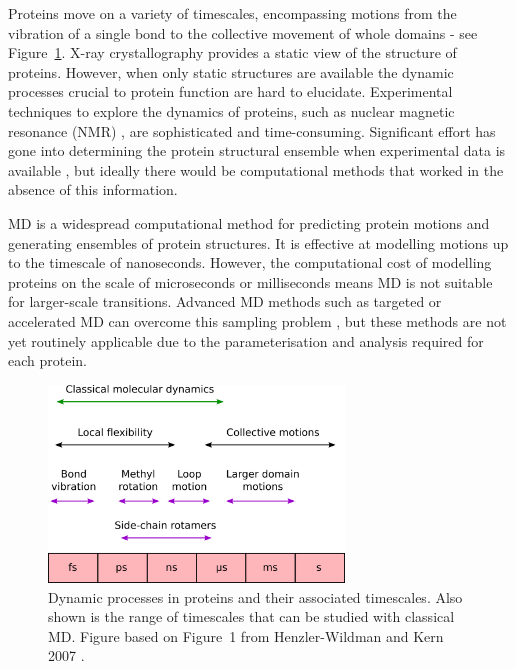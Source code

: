 
Proteins move on a variety of timescales, encompassing motions from the vibration of a single bond to the collective movement of whole domains \cite{Henzler-Wildman2007, Wei2016} - see Figure~\ref{fig:timescales}.
X-ray crystallography provides a static view of the structure of proteins.
However, when only static structures are available the dynamic processes crucial to protein function \cite{Henzler-Wildman2007a} are hard to elucidate.
Experimental techniques to explore the dynamics of proteins, such as nuclear magnetic resonance (NMR) \cite{Sormanni2017}, are sophisticated and time-consuming.
Significant effort has gone into determining the protein structural ensemble when experimental data is available \cite{Bonomi2017}, but ideally there would be computational methods that worked in the absence of this information.

MD is a widespread computational method for predicting protein motions and generating ensembles of protein structures.
It is effective at modelling motions up to the timescale of nanoseconds.
However, the computational cost of modelling proteins on the scale of microseconds or milliseconds means MD is not suitable for larger-scale transitions.
Advanced MD methods such as targeted or accelerated MD can overcome this sampling problem \cite{Maximova2016}, but these methods are not yet routinely applicable due to the parameterisation and analysis required for each protein.


\begin{figure}
\centering

\includegraphics[width=0.7\textwidth]{figures/timescales/timescales}

\caption[Timescales of protein motions]
{Dynamic processes in proteins and their associated timescales.
Also shown is the range of timescales that can be studied with classical MD.
Figure based on Figure~1 from Henzler-Wildman and Kern 2007 \cite{Henzler-Wildman2007}.}

\label{fig:timescales}
\end{figure}


